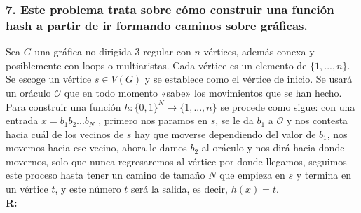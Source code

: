 \documentclass[14pt]{article}
\begin{document}
\subsubsection*{7. Este problema trata sobre cómo construir una función hash a partir de ir formando caminos sobre gráficas.}
  Sea $G$ una gráfica no dirigida 3-regular con $n$ vértices, además conexa y posiblemente con loops o multiaristas. Cada vértice es un elemento de $\{1, ... , n\}$. Se escoge un vértice $s \in V (G)$ y se establece como el vértice de inicio. Se usará un oráculo $\mathcal{O}$ que en todo momento «sabe» los movimientos que se han hecho. Para construir una función $h : \{0, 1\}^N \rightarrow \{1, ... , n\}$ se procede como sigue: con una entrada $x = b_1 b_2 ... b_N$ , primero nos paramos en $s$, se le da $b_1$ a $\mathcal{O}$ y nos contesta hacia cuál de los vecinos de $s$ hay que moverse dependiendo del valor de $b_1$, nos movemos hacia ese vecino, ahora le damos $b_2$ al oráculo y nos dirá hacia donde movernos, solo que nunca regresaremos al vértice por donde llegamos, seguimos este proceso hasta tener un camino de tamaño $N$ que empieza en $s$ y termina en un vértice $t$, y este número $t$ será la salida, es decir, $h(x) = t$. \\
\textbf{R:} 
\end{document}
